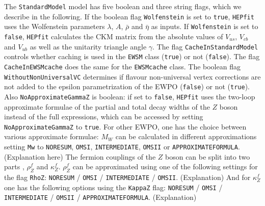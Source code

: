 \documentclass[preprint,3p,12pt]{elsarticle}
\newcommand{\HEPfit}{\texttt{HEPfit}\xspace}
\begin{document}
The \texttt{StandardModel} model has five boolean and three string flags, which we describe in the following. If the boolean flag \texttt{Wolfenstein} is set to \texttt{true}, \HEPfit uses the Wolfenstein parameters $\lambda$, $A$, $\bar{\rho}$ and $\bar{\eta}$ as inputs. If \texttt{Wolfenstein} is set to \texttt{false}, \HEPfit calculates the CKM matrix from the absolute values of $V_{us}$, $V_{cb}$ and $V_{ub}$ as well as the unitarity triangle angle $\gamma$. The flag \texttt{CacheInStandardModel} controls whether caching is used in the \texttt{EWSM} class (\texttt{true}) or not (\texttt{false}). The flag \texttt{CacheInEWSMcache} does the same for the \texttt{EWSMcache} class. The boolean flag \texttt{WithoutNonUniversalVC} determines if flavour non-universal vertex corrections are not added to the epsilon parametrization of the EWPO (\texttt{false}) or not (\texttt{true}). Also \texttt{NoApproximateGammaZ} is boolean: if set to \texttt{false}, \HEPfit uses the two-loop approximate formulae of the partial and total decay widths of the $Z$ boson instead of the full expressions, which can be accessed by setting \texttt{NoApproximateGammaZ} to \texttt{true}.
For other EWPO, one has the choice between various approximate formulae: $M_W$ can be calculated in different approximations setting \texttt{Mw} to \texttt{NORESUM}, \texttt{OMSI}, \texttt{INTERMEDIATE}, \texttt{OMSII} or \texttt{APPROXIMATEFORMULA}. (Explanation here)
The fermion couplings of the $Z$ boson can be split into two parts \cite{pdg}, $\rho_Z^f$ and $\kappa_Z^f$.
$\rho_Z^f$ can be approximated using one of the following settings for the flag \texttt{RhoZ}: \texttt{NORESUM} / \texttt{OMSI} / \texttt{INTERMEDIATE} / \texttt{OMSII}. (Explanation)
And for $\kappa_Z^f$ one has the following options using the \texttt{KappaZ} flag: \texttt{NORESUM} / \texttt{OMSI} / \texttt{INTERMEDIATE} / \texttt{OMSII} / \texttt{APPROXIMATEFORMULA}. (Explanation)
\end{document}
